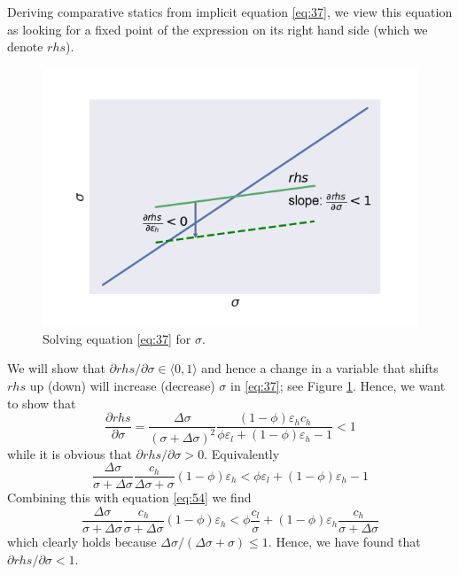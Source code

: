 \documentclass[a4paper,12pt]{article}
\begin{document}
Deriving comparative statics from implicit equation \eqref{eq:37}, we view this equation as looking for a fixed point of the expression on its right hand side (which we denote \(rhs\)).

\begin{figure}[htbp]
\centering
\includegraphics[width=.9\linewidth]{./fixedpoint.png}
\caption{\label{fig:fixedpoint}Solving equation \eqref{eq:37} for \(\sigma\).}
\end{figure}

We will show that \(\partial rhs/\partial \sigma \in \langle 0,1 \rangle\) and hence a change in a variable that shifts \(rhs\) up (down) will increase (decrease) \(\sigma\) in \eqref{eq:37}; see Figure \ref{fig:fixedpoint}. Hence, we want to show that
\begin{equation}
\label{eq:25}
\frac{\partial rhs}{\partial \sigma} = \frac{\Delta \sigma}{(\sigma+\Delta \sigma)^2} \frac{(1-\phi) \varepsilon_h c_h}{\phi \varepsilon_l + (1-\phi) \varepsilon_h -1} < 1
\end{equation}
while it is obvious that \(\partial rhs/\partial \sigma >0\). Equivalently
\begin{equation}
\label{eq:27}
\frac{\Delta \sigma}{\sigma + \Delta \sigma} \frac{c_h}{\Delta \sigma + \sigma}(1-\phi)\varepsilon_h < \phi \varepsilon_l + (1-\phi) \varepsilon_h -1
\end{equation}
Combining this with equation \eqref{eq:54} we find
\begin{equation}
\label{eq:30}
\frac{\Delta \sigma}{\sigma+\Delta \sigma}\frac{c_h}{\sigma+\Delta\sigma}(1-\phi)\varepsilon_h < \phi \frac{c_l}{\sigma}+(1-\phi)\varepsilon_h \frac{c_h}{\sigma+\Delta\sigma}
\end{equation}
which clearly holds because \(\Delta\sigma/(\Delta\sigma+\sigma) \leq 1\). Hence, we have found that \(\partial rhs/\partial \sigma < 1\).
\end{document}
